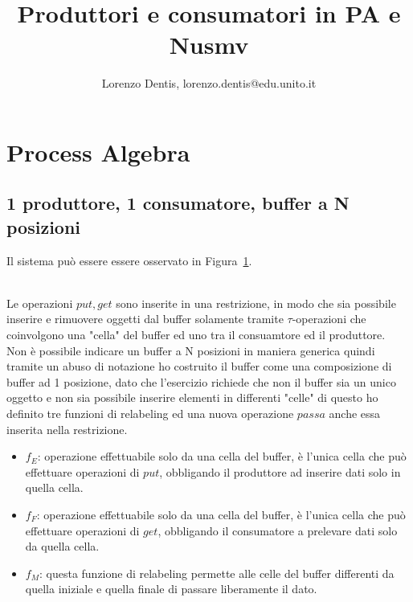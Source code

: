 \documentclass[a4paper]{article}
\begin{document}
\addtolength{\topmargin}{-100pt}
\addtolength{\textheight}{160pt}


\author{Lorenzo Dentis, lorenzo.dentis@edu.unito.it}
\title{Produttori e consumatori in PA e Nusmv}
\maketitle
\section{Process Algebra}
\subsection{1 produttore, 1 consumatore, buffer a N posizioni}
\label{SEC:PA_1}
Il sistema può essere essere osservato in Figura~\ref{FIG:ES3Setting1SYS}.\\
\begin{figure}[!ht]
  \label{FIG:ES3Setting1SYS}
\end{figure}\\
Le operazioni $put,get$ sono inserite in una restrizione, in modo che sia possibile inserire e rimuovere oggetti dal buffer solamente tramite $\tau$-operazioni che coinvolgono una "cella" del buffer ed uno tra il consuamtore ed il produttore.\\
Non è possibile indicare un buffer a N posizioni in maniera generica quindi tramite un abuso di notazione ho costruito il buffer come una composizione di buffer ad 1 posizione, dato che l'esercizio richiede che non il buffer sia un unico oggetto e non sia possibile inserire elementi in differenti "celle" di questo ho definito tre funzioni di relabeling ed una nuova operazione $passa$ anche essa inserita nella restrizione.
\begin{itemize}
	\item $f_E$: operazione effettuabile solo da una cella del buffer, è l'unica cella che può effettuare operazioni di $put$, obbligando il produttore ad inserire dati solo in quella cella.
	\item $f_F$: operazione effettuabile solo da una cella del buffer, è l'unica cella che può effettuare operazioni di $get$, obbligando il consumatore a prelevare dati solo da quella cella.
	\item $f_M$: questa funzione di relabeling permette alle celle del buffer differenti da quella iniziale e quella finale di passare liberamente il dato.
\end{itemize}
\end{document}
